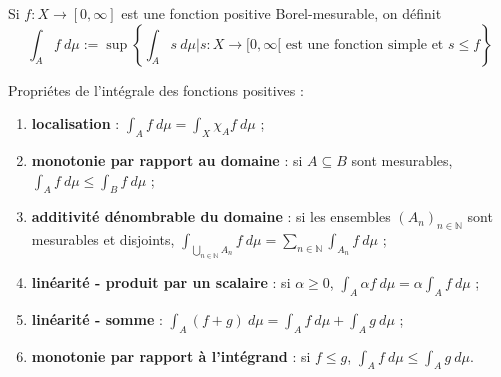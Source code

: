 \begin{definition}
    Si $f:X\to[0,\infty]$ est une fonction positive Borel-mesurable, on définit
    \begin{equation*}
        \int_Af\ d\mu := \sup\left\{\int_A s\ d\mu\Big|s:X\to[0,\infty[ \text{ est une fonction simple et } s\leq f \right\}
    \end{equation*}
\end{definition}

Propriétes de l'intégrale des fonctions positives :
\begin{enumerate}[label=(\roman*)]
    \item \textbf{localisation} : $\int_Af\ d\mu = \int_X \chi_Af\ d\mu$ ;
    \item \textbf{monotonie par rapport au domaine} : si $A\subseteq B$ sont mesurables, $\int_Af\ d\mu \leq \int_Bf\ d\mu$ ;
    \item \textbf{additivité dénombrable du domaine} : si les ensembles $(A_n)_{n\in\mathbb{N}}$ sont mesurables et disjoints, $\int_{\bigcup_{n\in\mathbb{N}}A_n}f\ d\mu = \sum_{n\in\mathbb{N}}\int_{A_n}f \ d\mu$ ;
    \item \textbf{linéarité - produit par un scalaire} : si $\alpha\geq0$, $\int_A\alpha f\ d\mu = \alpha\int_Af\ d\mu$ ;
    \item \textbf{linéarité - somme} : $\int_A(f+g)\ d\mu = \int_Af\ d\mu+\int_Ag\ d\mu$ ;
    \item \textbf{monotonie par rapport à l'intégrand} : si $f\leq g$, $\int_Af\ d\mu \leq \int_Ag\ d\mu$.
\end{enumerate}
